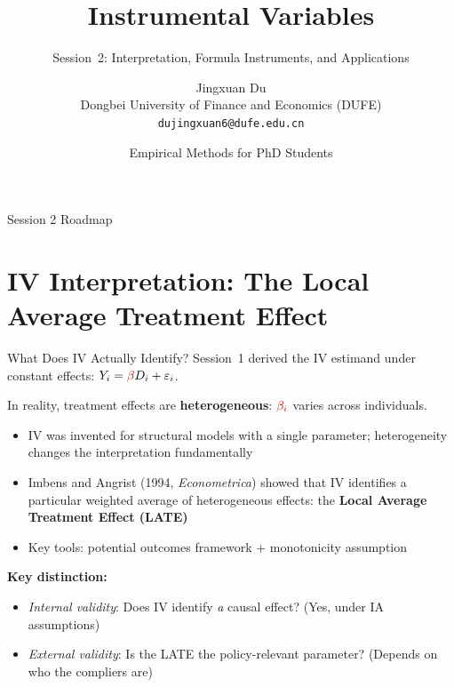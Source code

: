 \documentclass{beamer}
\title{Instrumental Variables}
\subtitle{Session~2: Interpretation, Formula Instruments, and Applications}
\author[Jingxuan Du]{Jingxuan Du\\[4pt]
  {\small Dongbei University of Finance and Economics (DUFE)}\\[2pt]
  {\small\texttt{dujingxuan6@dufe.edu.cn}}}
\date{Empirical Methods for PhD Students}
\begin{document}
\begin{frame}
  \titlepage
\end{frame}

\begin{frame}{Session 2 Roadmap}
\tableofcontents
\end{frame}

\section{IV Interpretation: The Local Average Treatment Effect}

\begin{frame}{What Does IV Actually Identify?}
Session~1 derived the IV estimand under constant effects:
$Y_i=\violetRed{\beta}D_i+\varepsilon_i$.

\medskip
In reality, treatment effects are \textbf{heterogeneous}: $\violetRed{\beta_i}$
varies across individuals.
\begin{itemize}
  \item IV was invented for structural models with a single parameter;
        heterogeneity changes the interpretation fundamentally
  \item Imbens and Angrist (1994, \emph{Econometrica}) showed that IV
        identifies a particular weighted average of heterogeneous effects:
        the \textbf{Local Average Treatment Effect (LATE)}
  \item Key tools: potential outcomes framework + monotonicity assumption
\end{itemize}

\medskip
\textbf{Key distinction:}
\begin{itemize}
  \item \emph{Internal validity}: Does IV identify \emph{a} causal effect?
        (Yes, under IA assumptions)
  \item \emph{External validity}: Is the LATE the policy-relevant parameter?
        (Depends on who the compliers are)
\end{itemize}
\end{frame}
\end{document}

